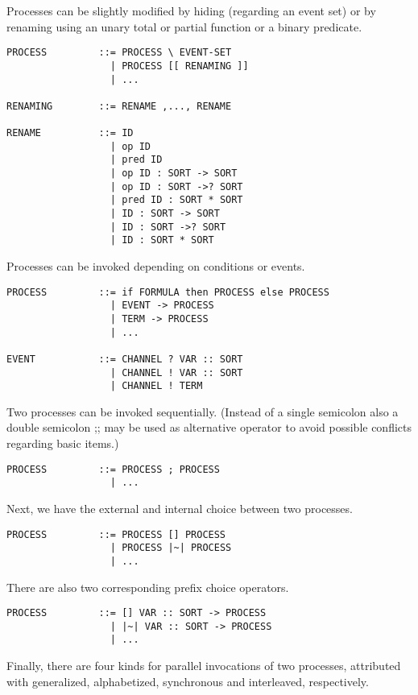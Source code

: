 \documentclass{article}
\begin{document}
Processes can be slightly modified by hiding (regarding an event set) or by
renaming using an unary total or partial function or a binary predicate.

\begin{verbatim}
PROCESS         ::= PROCESS \ EVENT-SET
                  | PROCESS [[ RENAMING ]]
                  | ...

RENAMING        ::= RENAME ,..., RENAME

RENAME          ::= ID
                  | op ID
                  | pred ID
                  | op ID : SORT -> SORT
                  | op ID : SORT ->? SORT
                  | pred ID : SORT * SORT
                  | ID : SORT -> SORT
                  | ID : SORT ->? SORT
                  | ID : SORT * SORT
\end{verbatim}

Processes can be invoked depending on conditions or events.

\begin{verbatim}
PROCESS         ::= if FORMULA then PROCESS else PROCESS
                  | EVENT -> PROCESS
                  | TERM -> PROCESS
                  | ...

EVENT           ::= CHANNEL ? VAR :: SORT
                  | CHANNEL ! VAR :: SORT
                  | CHANNEL ! TERM
\end{verbatim}

Two processes can be invoked sequentially. (Instead of a single semicolon also
a double semicolon ;; may be used as alternative operator to avoid possible
conflicts regarding basic items.)

\begin{verbatim}
PROCESS         ::= PROCESS ; PROCESS
                  | ...
\end{verbatim}

Next, we have the external and internal choice between two processes.

\begin{verbatim}
PROCESS         ::= PROCESS [] PROCESS
                  | PROCESS |~| PROCESS
                  | ...
\end{verbatim}

There are also two corresponding prefix choice operators.
\begin{verbatim}
PROCESS         ::= [] VAR :: SORT -> PROCESS
                  | |~| VAR :: SORT -> PROCESS
                  | ...
\end{verbatim}

Finally, there are four kinds for parallel invocations of two processes,
attributed with generalized, alphabetized, synchronous and interleaved,
respectively.
\end{document}
